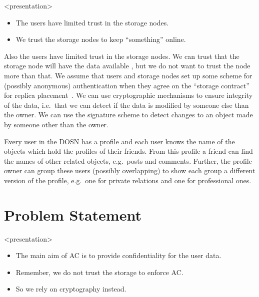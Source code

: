 \begin{frame}<presentation>
  \begin{itemize}

    \item The users have limited trust in the storage nodes.

    \item We trust the storage nodes to keep \enquote{something} online.

  \end{itemize}
\end{frame}
Also the users have limited trust in the storage nodes.
We can trust that the storage node will have the data available 
\cite{dataavailability,replicaplacement}, but we do not want to trust the node 
more than that.
We assume that users and storage nodes set up some scheme for (possibly 
anonymous) authentication when they agree on the \enquote{storage contract} for 
replica placement~\cite{replicaplacement}.
We can use cryptographic mechanisms to ensure integrity of the data, i.e.~that 
we can detect if the data is modified by someone else than the owner.
We can use the signature scheme to detect changes to an object made by someone 
other than the owner.

Every user in the \ac{DOSN} has a profile and each user knows the name of the 
objects which hold the profiles of their friends.
From this profile a friend can find the names of other related objects, 
e.g.~posts and comments.
Further, the profile owner can group these users (possibly overlapping) to show 
each group a different version of the profile, e.g.~one for private relations 
and one for professional ones.


\section{Problem Statement}\label{sec:ProblemStatement}


\begin{frame}<presentation>
  \begin{itemize}

    \item The main aim of \ac{AC} is to provide confidentiality for the user 
      data.

    \item Remember, we do not trust the storage to enforce \ac{AC}.

    \item So we rely on cryptography instead.

  \end{itemize}
\end{frame}

